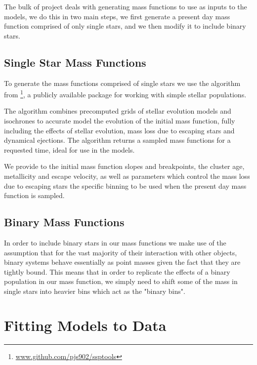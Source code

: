 The bulk of project deals with generating mass functions to use as inputs to the 
models, we do this in two main steps, we first generate a present day mass function comprised of
only single stars, and we then modify it to include binary stars.

\subsection{Single Star Mass Functions}

To generate the mass functions comprised of single stars we use the \evolvemf{} algorithm from
\footnote{\url{www.github.com/pjs902/ssptools}}, a publicly available package for
working with simple stellar populations.

The \evolvemf{} algorithm combines precomputed grids of stellar evolution models and isochrones to
accurate model the evolution of the initial mass function, fully including the effects of stellar
evolution, mass loss due to escaping stars and dynamical ejections. The algorithm returns a sampled
mass functions for a requested time, ideal for use in the  models.

We provide to \evolvemf{} the initial mass function slopes and breakpoints, the cluster age,
metallicity and escape velocity, as well as parameters which control the mass loss due to escaping
stars the specific binning to be used when the present day mass function is sampled.



\subsection{Binary Mass Functions}

In order to include binary stars in our mass functions we make use of the assumption that for the
vast majority of their interaction with other objects, binary systems behave essentially as point
masses given the fact that they are tightly bound. This means that in order to replicate the effects
of a binary population in our mass function, we simply need to shift some of the mass in single
stars into heavier bins which act as the "binary bins".






\section{Fitting Models to Data}

